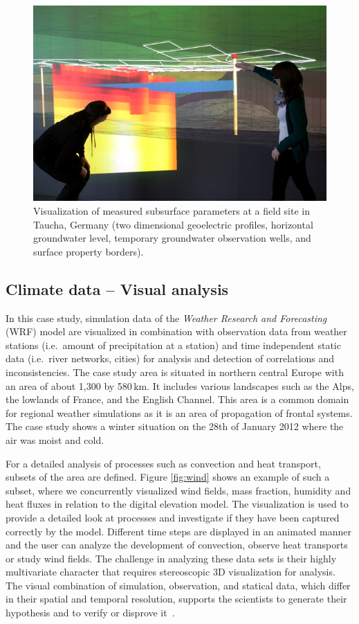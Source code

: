 \documentclass[twocolumn]{svjour3}          %
\begin{document}
\begin{figure}[htb]
  \includegraphics[width=\linewidth]{images/geothermal_shallow.png}
  \caption{Visualization of measured subsurface parameters at a field site in Taucha, Germany (two dimensional geoelectric profiles, horizontal groundwater level, temporary groundwater observation wells, and surface property borders).}
\label{fig:geothermal_shallow}
\end{figure}

\subsection{Climate data -- Visual analysis}
\label{climate-data}

In this case study, simulation data of the \emph{Weather Research and Forecasting} (WRF) model are visualized in combination with observation data from weather stations (i.e.~amount of precipitation at a station) and time independent static data (i.e.~river networks, cities) for analysis and detection of correlations and inconsistencies. The case study area is situated in northern central Europe with an area of about 1,300 by 580\,km. It includes various landscapes such as the Alps, the lowlands of France, and the English Channel. This area is a common domain for regional weather simulations as it is an area of propagation of frontal systems. The case study shows a winter situation on the 28th of January 2012 where the air was moist and cold.

For a detailed analysis of processes such as convection and heat transport, subsets of the area are defined. Figure \ref{fig:wind} shows an example of such a subset, where we concurrently visualized wind fields, mass fraction, humidity and heat fluxes in relation to the digital elevation model. The visualization is used to provide a detailed look at processes and investigate if they have been captured correctly by the model. Different time steps are displayed in an animated manner and the user can analyze the development of convection, observe heat transports or study wind fields. The challenge in analyzing these data sets is their highly multivariate character that requires stereoscopic 3D visualization for analysis. The visual combination of simulation, observation, and statical data, which differ in their spatial and temporal resolution, supports the scientists to generate their hypothesis and to verify or disprove it~\cite{helbig:eesenvirvis}.
\end{document}
